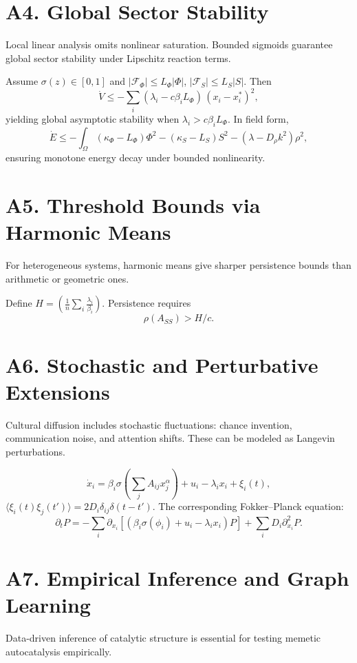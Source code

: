 \documentclass[11pt,a4paper]{article}
\newenvironment{narrative}{\begin{itshape}}{\end{itshape}}
\begin{document}
\section{A4. Global Sector Stability}
\begin{narrative}
Local linear analysis omits nonlinear saturation.  Bounded sigmoids guarantee global sector stability under Lipschitz reaction terms.
\end{narrative}

Assume \(\sigma(z)\in[0,1]\) and 
\(|\mathcal F_\Phi|\le L_\Phi|\Phi|\), 
\(|\mathcal F_S|\le L_S|S|\).  
Then
\[
\dot V \le -\sum_i(\lambda_i - c\beta_iL_\Phi)\,(x_i-x_i^*)^2,
\]
yielding global asymptotic stability when \(\lambda_i>c\beta_iL_\Phi\).  
In field form,
\[
\dot E \le -\!\int_\Omega\!(\kappa_\Phi-L_\Phi)\Phi^2
-(\kappa_S-L_S)S^2-(\lambda-D_\rho k^2)\rho^2,
\]
ensuring monotone energy decay under bounded nonlinearity.

\section{A5. Threshold Bounds via Harmonic Means}
\begin{narrative}
For heterogeneous systems, harmonic means give sharper persistence bounds than arithmetic or geometric ones.
\end{narrative}

Define \(H = \left( \tfrac{1}{n}\sum_i\frac{\lambda_i}{\beta_i} \right)\).
Persistence requires
\[
\rho(A_{SS}) > H / c.
\]

\section{A6. Stochastic and Perturbative Extensions}
\begin{narrative}
Cultural diffusion includes stochastic fluctuations: chance invention, communication noise, and attention shifts.  These can be modeled as Langevin perturbations.
\end{narrative}

\[
\dot{x}_i = \beta_i\sigma\!\left(\sum_jA_{ij}x_j^\alpha\right)
+u_i-\lambda_i x_i+\xi_i(t),
\]
\(\langle\xi_i(t)\xi_j(t')\rangle=2D_i\delta_{ij}\delta(t-t')\).
The corresponding Fokker–Planck equation:
\[
\partial_t P =
-\sum_i\partial_{x_i}\!\left[(\beta_i\sigma(\phi_i)
+u_i-\lambda_i x_i)P\right]
+\sum_iD_i\partial_{x_i}^2P.
\]

\section{A7. Empirical Inference and Graph Learning}
\begin{narrative}
Data-driven inference of catalytic structure is essential for testing memetic autocatalysis empirically.
\end{narrative}
\end{document}
